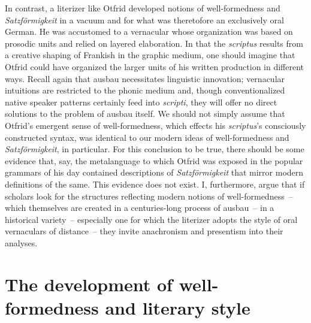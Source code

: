 In contrast, a literizer like Otfrid developed notions of well-formedness and \textit{Satzförmigkeit} in a vacuum and for what was theretofore an exclusively oral German. He was accustomed to a vernacular whose organization was based on prosodic units and relied on layered elaboration. In that the \textit{scriptus} results from a creative shaping of Frankish in the graphic medium, one should imagine that Otfrid could have organized the larger units of his written production in different ways. Recall again that ausbau necessitates linguistic innovation; vernacular intuitions are restricted to the phonic medium and, though conventionalized native speaker patterns certainly feed into \textit{scripti}, they will offer no direct solutions to the problem of ausbau itself. We should not simply assume that Otfrid’s emergent sense of well-formedness, which effects his \textit{scriptus}’s consciously constructed syntax, was identical to our modern ideas of well-formedness and \textit{Satzförmigkeit}, in particular. For this conclusion to be true, there should be some evidence that, say, the metalanguage to which Otfrid was exposed in the popular grammars of his day contained descriptions of \textit{Satzförmigkeit} that mirror modern definitions of the same. This evidence does not exist. I, furthermore, argue that if scholars look for the structures reflecting modern notions of well-formedness~-- which themselves are created in a centuries-long process of ausbau~-- in a historical variety~-- especially one for which the literizer adopts the style of oral vernaculars of distance~-- they invite anachronism and presentism into their analyses.

\section{The development of well-formedness and literary style }\label{sec:7.1}

